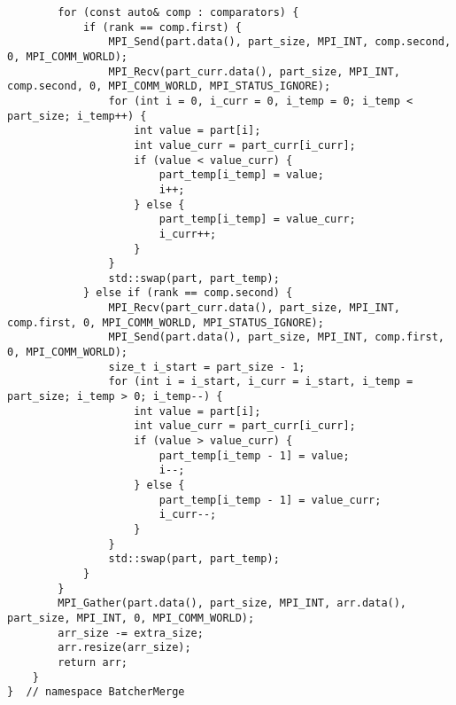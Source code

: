 \documentclass{report}
\begin{document}
\begin{lstlisting}
        for (const auto& comp : comparators) {
            if (rank == comp.first) {
                MPI_Send(part.data(), part_size, MPI_INT, comp.second, 0, MPI_COMM_WORLD);
                MPI_Recv(part_curr.data(), part_size, MPI_INT, comp.second, 0, MPI_COMM_WORLD, MPI_STATUS_IGNORE);
                for (int i = 0, i_curr = 0, i_temp = 0; i_temp < part_size; i_temp++) {
                    int value = part[i];
                    int value_curr = part_curr[i_curr];
                    if (value < value_curr) {
                        part_temp[i_temp] = value;
                        i++;
                    } else {
                        part_temp[i_temp] = value_curr;
                        i_curr++;
                    }
                }
                std::swap(part, part_temp);
            } else if (rank == comp.second) {
                MPI_Recv(part_curr.data(), part_size, MPI_INT, comp.first, 0, MPI_COMM_WORLD, MPI_STATUS_IGNORE);
                MPI_Send(part.data(), part_size, MPI_INT, comp.first, 0, MPI_COMM_WORLD);
                size_t i_start = part_size - 1;
                for (int i = i_start, i_curr = i_start, i_temp = part_size; i_temp > 0; i_temp--) {
                    int value = part[i];
                    int value_curr = part_curr[i_curr];
                    if (value > value_curr) {
                        part_temp[i_temp - 1] = value;
                        i--;
                    } else {
                        part_temp[i_temp - 1] = value_curr;
                        i_curr--;
                    }
                }
                std::swap(part, part_temp);
            }
        }
        MPI_Gather(part.data(), part_size, MPI_INT, arr.data(), part_size, MPI_INT, 0, MPI_COMM_WORLD);
        arr_size -= extra_size;
        arr.resize(arr_size);
        return arr;
    }
}  // namespace BatcherMerge
\end{lstlisting}
\end{document}
